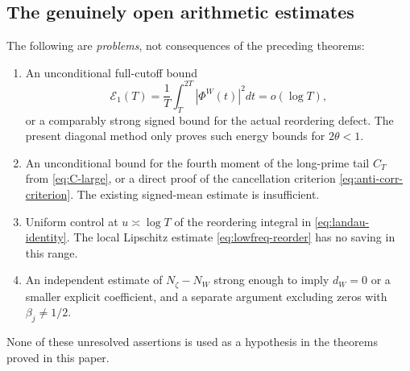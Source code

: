 \documentclass[11pt,leqno]{amsart}
\numberwithin{equation}{section}
\theoremstyle{definition}
\theoremstyle{remark}
\newcommand{\1}{\mathbf 1}
\begin{document}
\subsection{The genuinely open arithmetic estimates}\label{subsec:open}
The following are \emph{problems}, not consequences of the preceding theorems:
\begin{enumerate}
 \item An unconditional full-cutoff bound
 \begin{equation}\label{eq:open-energy}
 \mathcal E_1(T)=\frac1T\int_T^{2T}|\Phi^W(t)|^2dt=o(\log T),
 \end{equation}
 or a comparably strong signed bound for the actual reordering defect. The present diagonal method only proves such energy bounds for $2\theta<1$.
 \item An unconditional bound for the fourth moment of the long-prime tail $C_T$ from \eqref{eq:C-large}, or a direct proof of the cancellation criterion \eqref{eq:anti-corr-criterion}. The existing signed-mean estimate is insufficient.
 \item Uniform control at $u\asymp\log T$ of the reordering integral in \eqref{eq:landau-identity}. The local Lipschitz estimate \eqref{eq:lowfreq-reorder} has no saving in this range.
 \item An independent estimate of $N_\zeta-N_W$ strong enough to imply $d_W=0$ or a smaller explicit coefficient, and a separate argument excluding zeros with $\beta_j\ne1/2$.
\end{enumerate}
None of these unresolved assertions is used as a hypothesis in the theorems proved in this paper.
\end{document}
